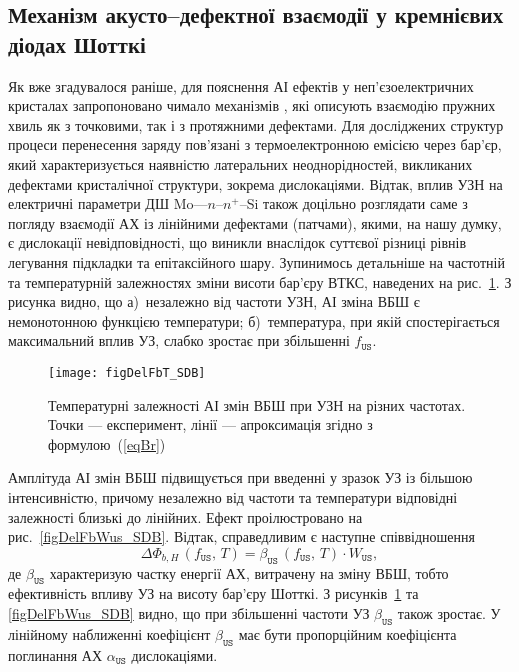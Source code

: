 \subsection{Механізм акусто--дефектної взаємодії у кремнієвих діодах Шотткі}

Як вже згадувалося раніше, для пояснення АІ ефектів у неп'єзоелектричних кристалах
запропоновано чимало механізмів \cite{Pavlovich,Korotchenkov1995,MirzadeJAP2011,PELESHCHAK:UPJ2016,Krevchik,MirzadeJAP2005,Davletova2008,OstrovKor92},
які описують взаємодію пружних хвиль як з точковими, так і з протяжними дефектами.
Для досліджених структур процеси перенесення заряду пов'язані з термоелектронною емісією
через бар'єр, який характеризується наявністю латеральних неоднорідностей, викликаних дефектами
кристалічної структури, зокрема дислокаціями.
Відтак, вплив УЗН на електричні параметри ДШ Mo---$n$--$n^+$--Si також доцільно розглядати саме з погляду
взаємодії АХ із лінійними дефектами (патчами), якими, на нашу думку, є дислокації невідповідності, що
виникли внаслідок суттєвої різниці рівнів легування підкладки та епітаксійного шару.
Зупинимось детальніше на частотній та температурній залежностях зміни висоти бар'єру ВТКС,
наведених на рис.~\ref{figDelFbT_SDB}.
З рисунка видно, що
а)~незалежно від частоти УЗН, АІ зміна ВБШ є немонотонною функцією температури;
б)~температура, при якій спостерігається максимальний вплив УЗ, слабко зростає при збільшенні $f_\mathtt{US}$.

\begin{figure}
\center
\texttt{[image: figDelFbT\_SDB]}
\caption{\label{figDelFbT_SDB}
Температурні залежності АІ змін ВБШ при УЗН на різних частотах.
Точки --- експеримент,
лінії --- апроксимація згідно з формулою~(\ref{eqBr})
}%
\end{figure}

Амплітуда АІ змін ВБШ підвищується при введенні у зразок УЗ із більшою інтенсивністю, причому незалежно від частоти та температури
відповідні залежності близькі до лінійних.
Ефект проілюстровано на рис.~\ref{figDelFbWus_SDB}.
Відтак, справедливим є наступне співвідношення
\begin{equation}
\label{eqBt}
\Delta\Phi_{b,H}\,(f_\mathtt{US},\,T)=\beta_\mathtt{US}\,(f_\mathtt{US},\,T)\cdot W_\mathtt{US},
\end{equation}
де
$\beta_\mathtt{US}$ характеризую частку енергії АХ, витрачену на зміну ВБШ, тобто
ефективність впливу УЗ на висоту бар'єру Шотткі.
З рисунків~\ref{figDelFbT_SDB} та \ref{figDelFbWus_SDB} видно, що при збільшенні частоти УЗ $\beta_\mathtt{US}$ також зростає.
У лінійному наближенні коефіцієнт $\beta_\mathtt{US}$ має бути пропорційним коефіцієнта поглинання АХ $\alpha_\mathtt{US}$ дислокаціями.

